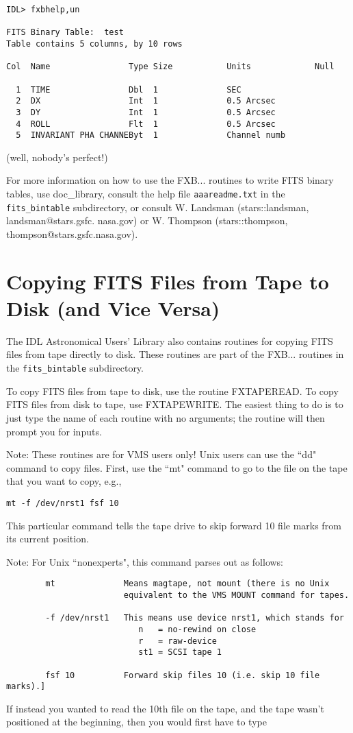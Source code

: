 \medskip\noindent
\begin{verbatim}
IDL> fxbhelp,un
 
FITS Binary Table:  test
Table contains 5 columns, by 10 rows
 
Col  Name                Type Size           Units             Null
 
  1  TIME                Dbl  1              SEC
  2  DX                  Int  1              0.5 Arcsec
  3  DY                  Int  1              0.5 Arcsec
  4  ROLL                Flt  1              0.5 Arcsec
  5  INVARIANT PHA CHANNEByt  1              Channel numb
\end{verbatim}
(well, nobody's perfect!)
 
For more information on how to use the FXB... routines to write FITS binary
tables, use doc{\_}library, consult the help file {\tt aaareadme.txt} in the
{\tt fits{\_}bintable} subdirectory, or consult W. Landsman (stars::landsman,
landsman@stars.gsfc. nasa.gov) or W. Thompson (stars::thompson,
thompson@stars.gsfc.nasa.gov).
 

\section{Copying FITS Files from Tape to Disk (and Vice Versa)}
 
The IDL Astronomical Users' Library also contains routines for copying
FITS files from tape directly to disk. These routines are part of the
FXB... routines in the {\tt fits{\_}bintable} subdirectory.
 
To copy FITS files from tape to disk, use the routine FXTAPEREAD. To copy
FITS files from disk to tape, use FXTAPEWRITE. The easiest thing to do is
to just type the name of each routine with no arguments; the routine will
then prompt you for inputs.
 
Note: These routines are for VMS users only! Unix users can use the ``dd"
command to copy files. First, use the ``mt" command to go to the file on the
tape that you want to copy, e.g.,

\medskip\noindent
\begin{verbatim}
mt -f /dev/nrst1 fsf 10
\end{verbatim}
This particular command tells the tape drive to skip forward 10 file marks
from its current position.
 
Note: For Unix ``nonexperts", this command parses out as follows:

\medskip\noindent
\begin{verbatim}
        mt              Means magtape, not mount (there is no Unix
                        equivalent to the VMS MOUNT command for tapes.
 
        -f /dev/nrst1   This means use device nrst1, which stands for
                           n   = no-rewind on close
                           r   = raw-device
                           st1 = SCSI tape 1
 
        fsf 10          Forward skip files 10 (i.e. skip 10 file marks).]
\end{verbatim}
If instead you wanted to read the 10th file on the tape, and the tape
wasn't positioned at the beginning, then you would first have to type

